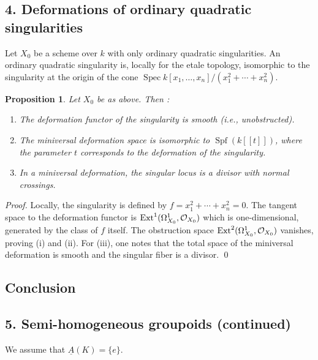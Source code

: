 \documentclass[11pt]{article}
\theoremstyle{plain}
\newtheorem{proposition}[theorem]{Proposition}
\theoremstyle{definition}
\theoremstyle{remark}
\DeclareMathOperator{\Spec}{Spec}
\DeclareMathOperator{\Spf}{Spf}
\DeclareMathOperator{\Ext}{Ext}
\newcommand{\uA}{\underline{A}}\newcommand{\uH}{\underline{H}}\newcommand{\uExt}{\underline{\operatorname{Ext}}}\newcommand{\uL}{\underline{L}}\newcommand{\uM}{\underline{M}}\newcommand{\uZ}{\underline{Z}}\newcommand{\uB}{\underline{B}}\newcommand{\uC}{\underline{C}}\newcommand{\uD}{\underline{D}}\newcommand{\uE}{\underline{E}}\newcommand{\uG}{\underline{G}}\newcommand{\uP}{\underline{P}}\newcommand{\uQ}{\underline{Q}}
\begin{document}
\subsection*{4. Deformations of ordinary quadratic singularities}

Let $X_0$ be a scheme over $k$ with only ordinary quadratic singularities. An ordinary quadratic singularity is, locally for the etale topology, isomorphic to the singularity at the origin of the cone $\Spec k[x_1, \ldots, x_n]/(x_1^2 + \cdots + x_n^2)$.

\begin{proposition}
Let $X_0$ be as above. Then :
\begin{enumerate}[label=(\roman*)]
\item The deformation functor of the singularity is smooth (i.e., unobstructed).
\item The miniversal deformation space is isomorphic to $\Spf(k[[t]])$, where the parameter $t$ corresponds to the deformation of the singularity.
\item In a miniversal deformation, the singular locus is a divisor with normal crossings.
\end{enumerate}
\end{proposition}

\begin{proof}
Locally, the singularity is defined by $f = x_1^2 + \cdots + x_n^2 = 0$. The tangent space to the deformation functor is $\Ext^1(\Omega^1_{X_0}, \cO_{X_0})$ which is one-dimensional, generated by the class of $f$ itself. The obstruction space $\Ext^2(\Omega^1_{X_0}, \cO_{X_0})$ vanishes, proving (i) and (ii). For (iii), one notes that the total space of the miniversal deformation is smooth and the singular fiber is a divisor.
\qed\end{proof}

\subsection*{Conclusion}

\subsection*{5. Semi-homogeneous groupoids (continued)}

We assume that $\uA(K) = \{e\}$.
\end{document}
